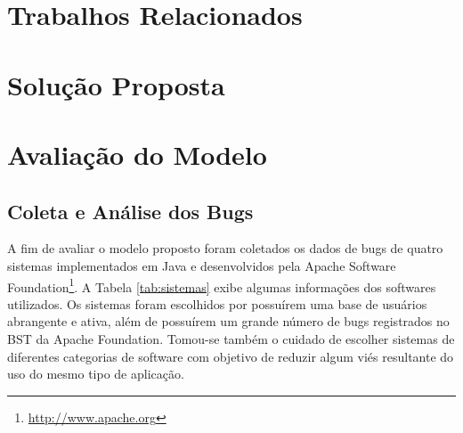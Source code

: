 \documentclass[12pt]{article}
\begin{document}
\section{Trabalhos Relacionados}
\label{sec:trab_relacionados}


\section{Solução Proposta}
\label{sec:proposta}

\section{Avaliação do Modelo}
\label{sec:avaliacao}

\subsection{Coleta e Análise dos Bugs}
\label{subsec:analise_coleta_bugs}

A fim de avaliar o modelo proposto foram coletados os dados de bugs de quatro sistemas implementados em Java e desenvolvidos pela Apache Software Foundation\footnote{\url{http://www.apache.org}}. A Tabela \ref{tab:sistemas} exibe algumas informações dos softwares utilizados. Os sistemas foram escolhidos por possuírem uma base de usuários abrangente e ativa, além de possuírem um grande número de bugs registrados no BST da Apache Foundation. Tomou-se também o cuidado de escolher sistemas de diferentes categorias de software com objetivo de reduzir algum viés resultante do uso do mesmo tipo de aplicação.

\begin{table}[h]
\caption{Sistemas utilizados na avaliação}
\label{tab:sistemas}
\end{table}
\end{document}
